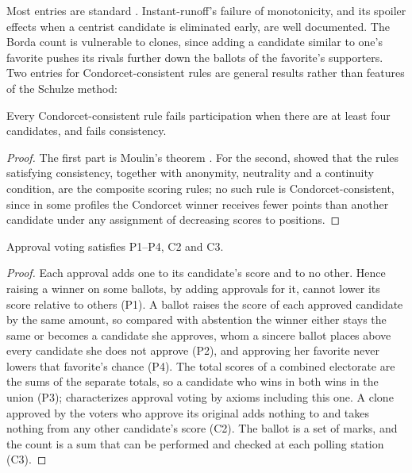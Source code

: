 \documentclass{situationist-preprint}
\begin{document}
Most entries are standard \citep{BramsFishburn1983,Saari2001}. Instant-runoff's failure of monotonicity, and its spoiler effects when a centrist candidate is eliminated early, are well documented. The Borda count is vulnerable to clones, since adding a candidate similar to one's favorite pushes its rivals further down the ballots of the favorite's supporters. Two entries for Condorcet-consistent rules are general results rather than features of the Schulze method:

\begin{lemma}\label{l:condorcet}
Every Condorcet-consistent rule fails participation when there are at least four candidates, and fails consistency.
\end{lemma}

\begin{proof}
The first part is Moulin's theorem \citep{Moulin1988}. For the second, \citet{Young1975} showed that the rules satisfying consistency, together with anonymity, neutrality and a continuity condition, are the composite scoring rules; no such rule is Condorcet-consistent, since in some profiles the Condorcet winner receives fewer points than another candidate under any assignment of decreasing scores to positions.
\end{proof}

\begin{proposition}\label{p:approval}
Approval voting satisfies P1--P4, C2 and C3.
\end{proposition}

\begin{proof}
Each approval adds one to its candidate's score and to no other. Hence raising a winner on some ballots, by adding approvals for it, cannot lower its score relative to others (P1). A ballot raises the score of each approved candidate by the same amount, so compared with abstention the winner either stays the same or becomes a candidate she approves, whom a sincere ballot places above every candidate she does not approve (P2), and approving her favorite never lowers that favorite's chance (P4). The total scores of a combined electorate are the sums of the separate totals, so a candidate who wins in both wins in the union (P3); \citet{Fishburn1978} characterizes approval voting by axioms including this one. A clone approved by the voters who approve its original adds nothing to and takes nothing from any other candidate's score (C2). The ballot is a set of marks, and the count is a sum that can be performed and checked at each polling station (C3).
\end{proof}
\end{document}
